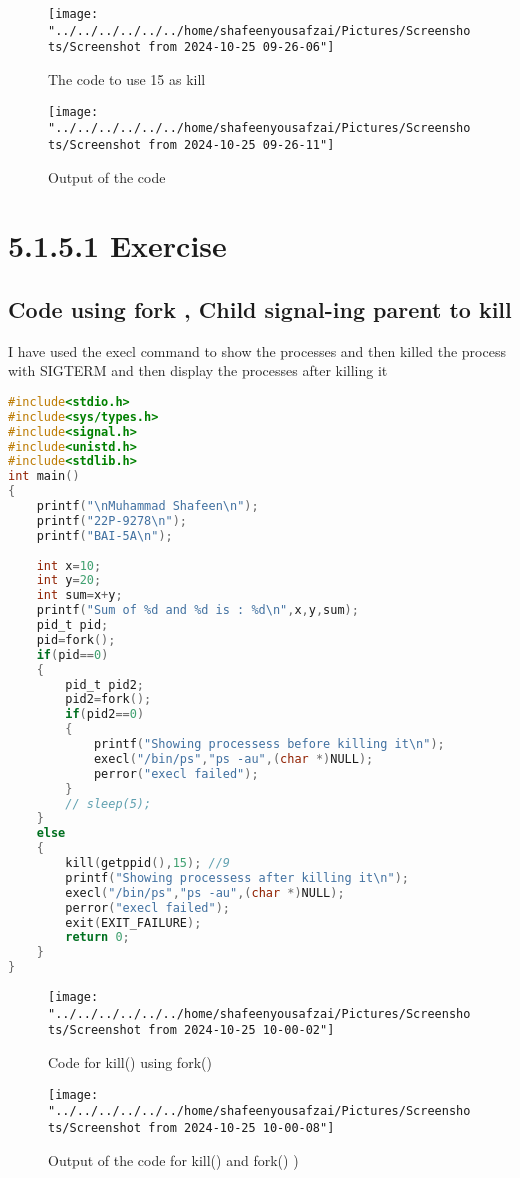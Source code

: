 \documentclass[12pt]{article}
\begin{document}
\begin{figure}[H]
	\centering
	\texttt{[image: "../../../../../../home/shafeenyousafzai/Pictures/Screenshots/Screenshot from 2024-10-25 09-26-06"]}
	\caption{The code to use 15 as kill }
	\label{fig:screenshot-from-2024-10-25-09-26-06}
\end{figure}
\begin{figure}[H]
	\centering
	\texttt{[image: "../../../../../../home/shafeenyousafzai/Pictures/Screenshots/Screenshot from 2024-10-25 09-26-11"]}
	\caption{Output of the code}
	\label{fig:screenshot-from-2024-10-25-09-26-11}
\end{figure}
\section{5.1.5.1 Exercise}
\subsection{Code using fork , Child signal-ing parent to kill}
I have used the execl command to show the processes 
and then killed the process with SIGTERM and then display the processes after killing it
\begin{lstlisting}[language=C, caption={Mini-Shell using execvp}]
#include<stdio.h>
#include<sys/types.h>
#include<signal.h>
#include<unistd.h>
#include<stdlib.h>
int main()
{
	printf("\nMuhammad Shafeen\n");
	printf("22P-9278\n");
	printf("BAI-5A\n");
	
	int x=10;
	int y=20;
	int sum=x+y;
	printf("Sum of %d and %d is : %d\n",x,y,sum);
	pid_t pid;
	pid=fork();
	if(pid==0)
	{
		pid_t pid2;
		pid2=fork();
		if(pid2==0)
		{
			printf("Showing processess before killing it\n");
			execl("/bin/ps","ps -au",(char *)NULL);
			perror("execl failed");
		}
		// sleep(5);
	}
	else
	{
		kill(getppid(),15); //9
		printf("Showing processess after killing it\n");
		execl("/bin/ps","ps -au",(char *)NULL);
		perror("execl failed");
		exit(EXIT_FAILURE);
		return 0;
	}
}
\end{lstlisting}
\begin{figure}[H]
	\centering
	\texttt{[image: "../../../../../../home/shafeenyousafzai/Pictures/Screenshots/Screenshot from 2024-10-25 10-00-02"]}
	\caption{Code for kill() using fork()}
	\label{fig:screenshot-from-2024-10-25-10-00-02}
\end{figure}
\begin{figure}[H]
	\centering
	\texttt{[image: "../../../../../../home/shafeenyousafzai/Pictures/Screenshots/Screenshot from 2024-10-25 10-00-08"]}
	\caption{Output of the code for kill() and fork() )}
	\label{fig:screenshot-from-2024-10-25-10-00-08}
\end{figure}
\end{document}

